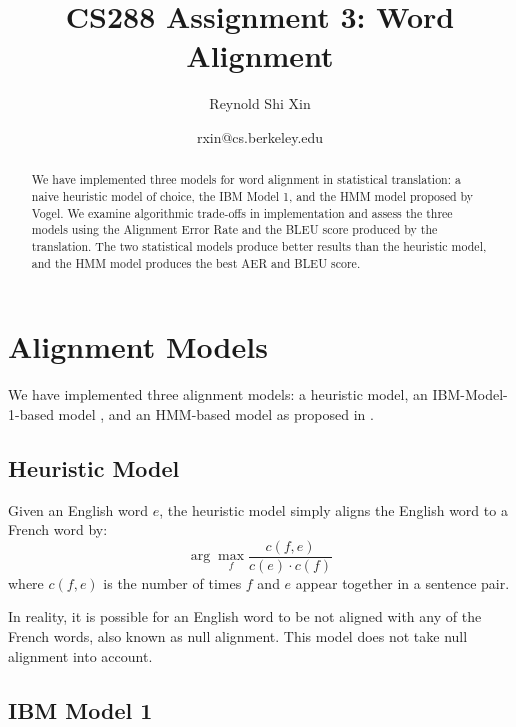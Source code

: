 \documentclass[12pt]{article}   %
\begin{document}
\title{CS288 Assignment 3: Word Alignment}   %
\author{Reynold Shi Xin}         %
\date{rxin@cs.berkeley.edu}    %
\maketitle

\begin{abstract}
We have implemented three models for word alignment in statistical translation: a naive heuristic model of choice, the IBM Model 1, and the HMM model proposed by Vogel. We examine algorithmic trade-offs in implementation and assess the three models using the Alignment Error Rate and the BLEU score produced by the translation. The two statistical models produce better results than the heuristic model, and the HMM model produces the best AER and BLEU score.
\end{abstract}


\section{Alignment Models}

We have implemented three alignment models: a heuristic model, an IBM-Model-1-based model \cite{ibm-models}, and an HMM-based model as proposed in \cite{hmm-model}.

\subsection{Heuristic Model}
Given an English word $e$, the heuristic model simply aligns the English word to a French word by:
$$ \arg\max_f \frac{c(f,e)}{c(e) \cdot c(f)} $$
where $c(f,e)$ is the number of times $f$ and $e$ appear together in a sentence pair.

In reality, it is possible for an English word to be not aligned with any of the French words, also known as null alignment. This model does not take null alignment into account.


\subsection{IBM Model 1}
\label{sec:em}
\end{document}
